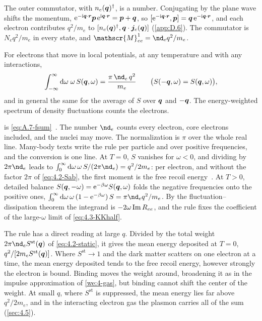 The outer commutator, with $n_e(\bm{q})^\dagger$, is a number. Conjugating by the plane wave shifts the momentum, $\mathrm{e}^{-\mathrm{i}\bm{q}\cdot\bm{r}}\bm{p}\,\mathrm{e}^{\mathrm{i}\bm{q}\cdot\bm{r}} = \bm{p} + \bm{q}$, so $[\mathrm{e}^{-\mathrm{i}\bm{q}\cdot\bm{r}}, \bm{p}] = \bm{q}\,\mathrm{e}^{-\mathrm{i}\bm{q}\cdot\bm{r}}$, and each electron contributes $q^2/m_e$ to $[n_e(\bm{q})^\dagger, \bm{q}\cdot\bm{j}_e(\bm{q})]$ (\cref{app:D.6}). The commutator is $N_eq^2/m_e$ in every state, and $\mathscr{M}^1_{ee} = \nd_eq^2/m_e$.
\begin{keyresult}
For electrons that move in local potentials, at any temperature and with any interactions,
\begin{equation}
  \int_{-\infty}^{\infty}\dd\omega\;\omega\,S(\vect{q},\omega) = \frac{\pi\,\nd_e\,q^2}{m_e} \qquad \bigl(S(-\vect{q},\omega) = S(\vect{q},\omega)\bigr) ,
  \label{eq:4.3-fsum}
\end{equation}
and in general the same for the average of $S$ over $\bm{q}$ and $-\bm{q}$. The energy-weighted spectrum of density fluctuations counts the electrons.
\end{keyresult}
 is \cref{eq:A.7-fsum}~\cite[Sect.~3.4]{giuliani2005quantum}. The number $\nd_e$ counts every electron, core electrons included, and the nuclei may move. The normalization is $\pi$ over the whole real line. Many-body texts write the rule per particle and over positive frequencies, and the conversion is one line. At $T = 0$, $S$ vanishes for $\omega < 0$, and dividing by $2\pi\nd_e$ leads to $\int_0^\infty\dd\omega\,\omega\,S/(2\pi\nd_e) = q^2/2m_e$: per electron, and without the factor $2\pi$ of \cref{eq:4.2-Sab}, the first moment is the free recoil energy~\cite[Chap.~2]{pines1966theory}. At $T > 0$, detailed balance $S(\bm{q},-\omega) = \mathrm{e}^{-\beta\omega}S(\bm{q},\omega)$ folds the negative frequencies onto the positive ones, $\int_0^\infty\dd\omega\,\omega\,(1 - \ee^{-\beta\omega})\,S = \pi\nd_eq^2/m_e$. By the fluctuation--dissipation theorem the integrand is $-2\omega\operatorname{Im} R_{ee}$, and the rule fixes the coefficient of the large-$\omega$ limit of \cref{eq:4.3-KKhalf}.

The rule has a direct reading at large $q$. Divided by the total weight $2\pi\nd_eS^{\mathrm{st}}(\vect{q})$ of \cref{eq:4.2-static}, it gives the mean energy deposited at $T = 0$, $q^2/[2m_eS^{\mathrm{st}}(\bm{q})]$. Where $S^{\mathrm{st}} \to 1$ and the dark matter scatters on one electron at a time, the mean energy deposited tends to the free recoil energy, however strongly the electron is bound. Binding moves the weight around, broadening it as in the impulse approximation of \cref{we:4-gas}, but binding cannot shift the center of the weight. At small $q$, where $S^{\mathrm{st}}$ is suppressed, the mean energy lies far above $q^2/2m_e$, and in the interacting electron gas the plasmon carries all of the sum (\cref{sec:4.5}).

